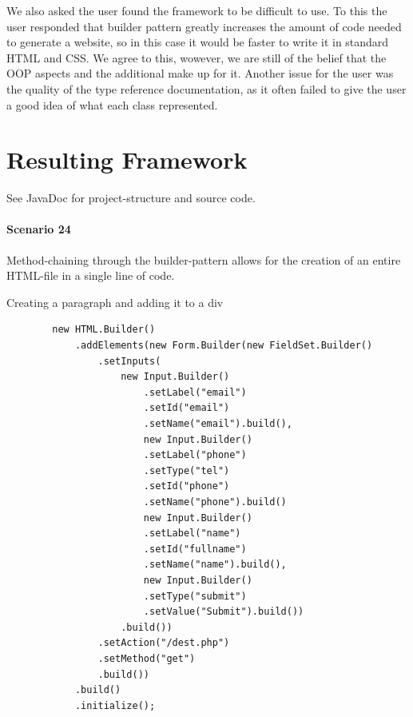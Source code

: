 \documentclass[12pt]{article}
\begin{document}
        We also asked the user found the framework to be difficult to use. To this the user responded that builder pattern greatly increases the amount of code needed to generate a website, so in this case it would be faster to write it in standard HTML and CSS. We agree to this, wowever, we are still of the belief that the OOP aspects and the additional make up for it. Another issue for the user was the quality of the type reference documentation, as it often failed to give the user a good idea of what each class represented.

\section{Resulting Framework}

    See JavaDoc for project-structure and source code.

    \paragraph{Scenario 24}
    Method-chaining through the builder-pattern allows for the creation of an entire HTML-file in a single line of code.

    \begin{shaded}
        Creating a paragraph and adding it to a div
        \begin{lstlisting}
        new HTML.Builder()
            .addElements(new Form.Builder(new FieldSet.Builder()
                .setInputs(
                    new Input.Builder()
                        .setLabel("email")
                        .setId("email")
                        .setName("email").build(),
                        new Input.Builder()
                        .setLabel("phone")
                        .setType("tel")
                        .setId("phone")
                        .setName("phone").build()
                        new Input.Builder()
                        .setLabel("name")
                        .setId("fullname")
                        .setName("name").build(),
                        new Input.Builder()
                        .setType("submit")
                        .setValue("Submit").build())
                    .build())
                .setAction("/dest.php")
                .setMethod("get")
                .build())
            .build()
            .initialize();
        \end{lstlisting}
    \end{shaded}
\end{document}
